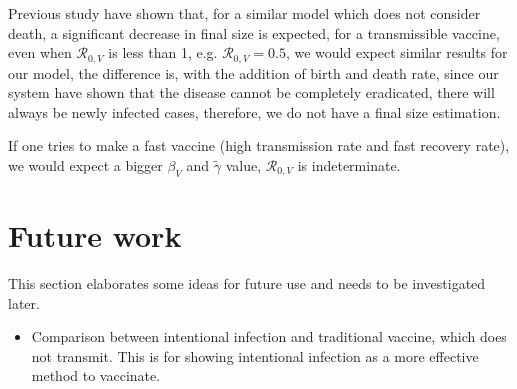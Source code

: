 \documentclass[12pt]{article}
\newcommand{\R}{\mathcal{R}}
\begin{document}
Previous study have shown that, for a similar model which does not consider death, a significant decrease in final size is expected, for a transmissible vaccine, even when $\R_{0,V}$ is less than 1, e.g. $\R_{0,V}=0.5$, we would expect similar results for our model, the difference is, with the addition of birth and death rate, since our system have shown that the disease cannot be completely eradicated, there will always be newly infected cases, therefore, we do not have a final size estimation. 

If one tries to make a fast vaccine (high transmission rate and fast recovery rate), we would expect a bigger $\beta_V$ and $\tilde{\gamma}$ value, $\R_{0,V}$ is indeterminate.

\section{Future work}
This section elaborates some ideas for future use and needs to be investigated later.
\begin{itemize}
\item Comparison between intentional infection and traditional vaccine, which does not transmit. This is for showing intentional infection as a more effective method to vaccinate.
\end{itemize}
\end{document}
